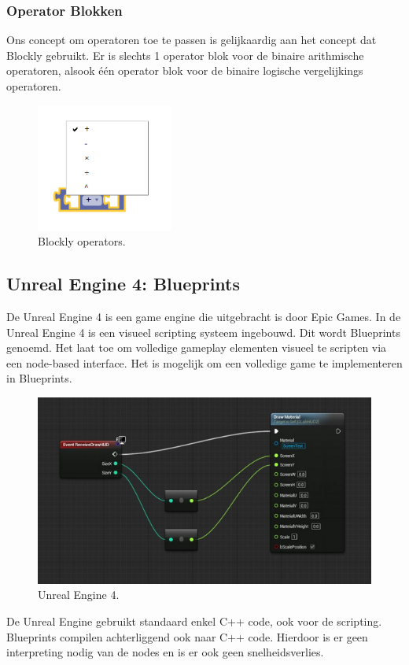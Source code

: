\documentclass[]{article}
\begin{document}
\subsubsection{Operator Blokken}
Ons concept om operatoren toe te passen is gelijkaardig aan het concept dat Blockly gebruikt. Er is slechts 1 operator blok voor de binaire arithmische operatoren, alsook \'{e}\'{e}n operator blok voor de binaire logische vergelijkings operatoren. 
\begin{figure}
\centering
\includegraphics[width=0.4\textwidth]{./BestaandeSoftware/blocklyopp.PNG}
\caption{Blockly operators.}
\end{figure}
\subsection{Unreal Engine 4: Blueprints}
De Unreal Engine 4 \cite{unreal} is een game engine die uitgebracht is door Epic Games. In de Unreal Engine 4 is een visueel scripting systeem ingebouwd. Dit wordt Blueprints genoemd. Het laat toe om volledige gameplay elementen visueel te scripten via een node-based interface. Het is mogelijk om een volledige game te implementeren in Blueprints.
\begin{figure}
\centering
\includegraphics[width=1.1\textwidth]{./BestaandeSoftware/unrealEngine.PNG}
\caption{Unreal Engine 4.}
\end{figure}
De Unreal Engine gebruikt standaard enkel C++ code, ook voor de scripting. Blueprints compilen achterliggend ook naar C++ code. Hierdoor is er geen interpreting nodig van de nodes en is er ook geen snelheidsverlies.
\end{document}
